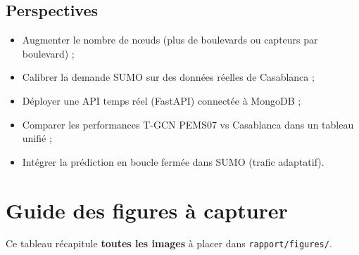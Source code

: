 \documentclass[12pt,a4paper]{report}
\begin{document}
\section{Perspectives}

\begin{itemize}
  \item Augmenter le nombre de nœuds (plus de boulevards ou capteurs par boulevard) ;
  \item Calibrer la demande SUMO sur des données réelles de Casablanca ;
  \item Déployer une API temps réel (FastAPI) connectée à MongoDB ;
  \item Comparer les performances T-GCN PEMS07 vs Casablanca dans un tableau unifié ;
  \item Intégrer la prédiction en boucle fermée dans SUMO (trafic adaptatif).
\end{itemize}

\appendix
\chapter{Guide des figures à capturer}

Ce tableau récapitule \textbf{toutes les images} à placer dans
\texttt{rapport/figures/}.
\end{document}
